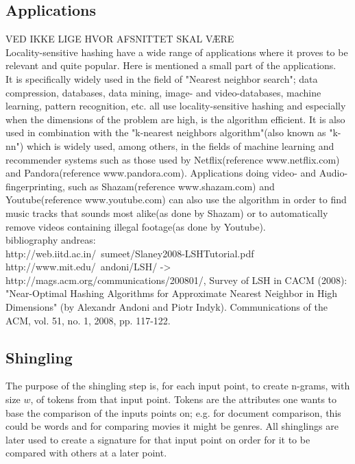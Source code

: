 \subsection{Applications}
VED IKKE LIGE HVOR AFSNITTET SKAL VÆRE\\
Locality-sensitive hashing have a wide range of applications where it proves to be relevant and quite popular. Here is mentioned a small part of the applications.  \\
It is specifically widely used in the field of "Nearest neighbor search"; data compression, databases, data mining, image- and video-databases, machine learning, pattern recognition, etc. all use locality-sensitive hashing and especially when the dimensions of the problem are high, is the algorithm efficient. 
It is also used in combination with the "k-nearest neighbors algorithm"(also known as "k-nn") which is widely used, among others, in the fields of machine learning and recommender systems such as those used by Netflix(reference www.netflix.com) and Pandora(reference www.pandora.com). Applications doing video- and Audio-fingerprinting, such as Shazam(reference www.shazam.com) and Youtube(reference www.youtube.com) can also use the algorithm in order to find music tracks that sounds most alike(as done by Shazam) or to automatically remove videos containing illegal footage(as done by Youtube).
\\
bibliography andreas: \\
http://web.iitd.ac.in/~sumeet/Slaney2008-LSHTutorial.pdf \\
http://www.mit.edu/~andoni/LSH/ -> http://mags.acm.org/communications/200801/, Survey of LSH in CACM (2008): "Near-Optimal Hashing Algorithms for Approximate Nearest Neighbor in High Dimensions" (by Alexandr Andoni and Piotr Indyk). Communications of the ACM, vol. 51, no. 1, 2008, pp. 117-122.

\subsection{Shingling}
The purpose of the shingling step is, for each input point, to create n-grams, with size \(w\), of tokens from that input point. Tokens are the attributes one wants to base the comparison of the inputs points on; e.g. for document comparison, this could be words and for comparing movies it might be genres. All shinglings are later used to create a signature for that input point on order for it to be compared with others at a later point. 
